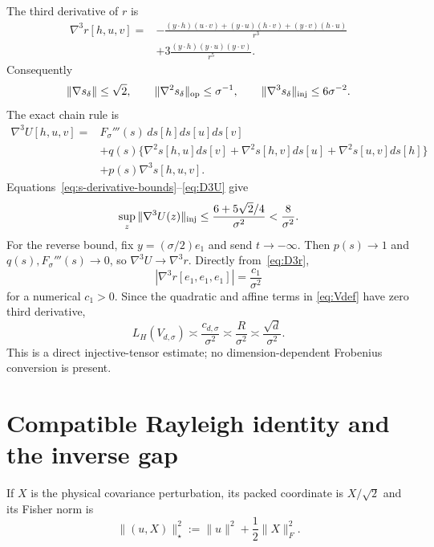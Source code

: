 \documentclass[11pt]{article}
\numberwithin{equation}{section}
\newcommand{\op}{\mathrm{op}}
\begin{document}
The third derivative of $r$ is
\begin{align}\label{eq:D3r}
 \nabla^3r[h,u,v]
={}&-\frac{(y\cdot h)(u\cdot v)+(y\cdot u)(h\cdot v)
 +(y\cdot v)(h\cdot u)}{r^3}\\
 &+3\frac{(y\cdot h)(y\cdot u)(y\cdot v)}{r^5}.
\end{align}
Consequently
\begin{equation}\label{eq:s-derivative-bounds}
 \|\nabla s_\delta\|\le\sqrt2,\qquad
 \|\nabla^2s_\delta\|_{\op}\le\sigma^{-1},\qquad
 \|\nabla^3s_\delta\|_{\rm inj}\le6\sigma^{-2}.
\end{equation}
The exact chain rule is
\begin{align}\label{eq:D3U}
 \nabla^3U[h,u,v]={}&F_\sigma'''(s)\,ds[h]ds[u]ds[v]\\
 &+q(s)\{\nabla^2s[h,u]ds[v]+\nabla^2s[h,v]ds[u]
 +\nabla^2s[u,v]ds[h]\}\\
 &+p(s)\nabla^3s[h,u,v].
\end{align}
Equations~\eqref{eq:s-derivative-bounds}--\eqref{eq:D3U} give
\begin{equation}\label{eq:D3U-upper}
 \sup_z\|\nabla^3U(z)\|_{\rm inj}
 \le\frac{6+5\sqrt2/4}{\sigma^2}<\frac8{\sigma^2}.
\end{equation}
For the reverse bound, fix $y=(\sigma/2)e_1$ and send $t\to-\infty$.
Then $p(s)\to1$ and $q(s),F_\sigma'''(s)\to0$, so
$\nabla^3U\to\nabla^3r$.  Directly from~\eqref{eq:D3r},
\[
 |\nabla^3r[e_1,e_1,e_1]|=\frac{c_1}{\sigma^2}
\]
for a numerical $c_1>0$.  Since the quadratic and affine terms in
\eqref{eq:Vdef} have zero third derivative,
\begin{equation}\label{eq:LH-frontier}
 L_H(V_{d,\sigma})\asymp\frac{c_{d,\sigma}}{\sigma^2}
 \asymp\frac R{\sigma^2}\asymp\frac{\sqrt d}{\sigma^2}.
\end{equation}
This is a direct injective-tensor estimate; no dimension-dependent
Frobenius conversion is present.

\section{Compatible Rayleigh identity and the inverse gap}\label{sec:gap}

If $X$ is the physical covariance perturbation, its packed coordinate is
$X/\sqrt2$ and its Fisher norm is
\begin{equation}\label{eq:Fisher-norm}
 \|(u,X)\|_\star^2:=\|u\|^2+\frac12\|X\|_F^2.
\end{equation}
\end{document}
